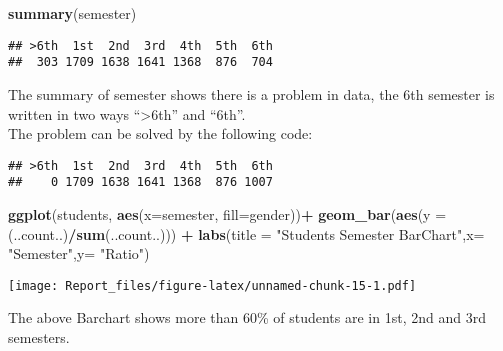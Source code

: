 \documentclass[
]{article}
\newenvironment{Shaded}{\begin{snugshade}}{\end{snugshade}}
\newcommand{\DataTypeTok}[1]{\textcolor[rgb]{0.13,0.29,0.53}{#1}}
\newcommand{\KeywordTok}[1]{\textcolor[rgb]{0.13,0.29,0.53}{\textbf{#1}}}
\newcommand{\NormalTok}[1]{#1}
\newcommand{\OperatorTok}[1]{\textcolor[rgb]{0.81,0.36,0.00}{\textbf{#1}}}
\newcommand{\StringTok}[1]{\textcolor[rgb]{0.31,0.60,0.02}{#1}}
\begin{document}
\begin{Shaded}
\begin{Highlighting}[]
\KeywordTok{summary}\NormalTok{(semester)}
\end{Highlighting}
\end{Shaded}

\begin{verbatim}
## >6th  1st  2nd  3rd  4th  5th  6th 
##  303 1709 1638 1641 1368  876  704
\end{verbatim}

The summary of semester shows there is a problem in data, the 6th
semester is written in two ways ``\textgreater6th'' and ``6th''.\\
The problem can be solved by the following code:

\begin{Shaded}
\end{Shaded}

\begin{verbatim}
## >6th  1st  2nd  3rd  4th  5th  6th 
##    0 1709 1638 1641 1368  876 1007
\end{verbatim}

\begin{Shaded}
\begin{Highlighting}[]
\KeywordTok{ggplot}\NormalTok{(students, }\KeywordTok{aes}\NormalTok{(}\DataTypeTok{x=}\NormalTok{semester, }\DataTypeTok{fill=}\NormalTok{gender))}\OperatorTok{+}
\StringTok{  }\KeywordTok{geom_bar}\NormalTok{(}\KeywordTok{aes}\NormalTok{(}\DataTypeTok{y =}\NormalTok{ (..count..)}\OperatorTok{/}\KeywordTok{sum}\NormalTok{(..count..))) }\OperatorTok{+}\StringTok{ }
\StringTok{  }\KeywordTok{labs}\NormalTok{(}\DataTypeTok{title =} \StringTok{"Students Semester BarChart"}\NormalTok{,}\DataTypeTok{x=} \StringTok{"Semester"}\NormalTok{,}\DataTypeTok{y=} \StringTok{"Ratio"}\NormalTok{)}
\end{Highlighting}
\end{Shaded}

\texttt{[image: Report\_files/figure-latex/unnamed-chunk-15-1.pdf]}

The above Barchart shows more than 60\% of students are in 1st, 2nd and
3rd semesters.
\end{document}
